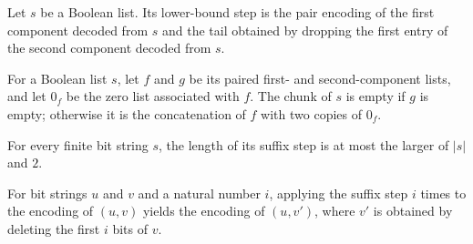 \begin{definition}
\label{Complexity.TQBFHard.lbStep}
\leanok
{}
Let $s$ be a Boolean list. Its lower-bound step is the pair encoding of the first
component decoded from $s$ and the tail obtained by dropping the first entry of the
second component decoded from $s$.
\end{definition}

\begin{definition}
\label{Complexity.TQBFHard.lbChunk}
\leanok
{}
For a Boolean list $s$, let $f$ and $g$ be its paired first- and second-component lists,
and let $0_f$ be the zero list associated with $f$. The chunk of $s$ is empty if $g$ is
empty; otherwise it is the concatenation of $f$ with two copies of $0_f$.
\end{definition}

\begin{theorem}
\label{Complexity.TQBFHard.length_lbStep}
\leanok
{}
For every finite bit string $s$, the length of its suffix step is at most the larger of
$|s|$ and $2$.
\end{theorem}

\begin{theorem}
\label{Complexity.TQBFHard.lbStep_iterate}
\leanok
{}
For bit strings $u$ and $v$ and a natural number $i$, applying the suffix step $i$ times
to the encoding of $(u,v)$ yields the encoding of $(u,v')$, where $v'$ is obtained by
deleting the first $i$ bits of $v$.
\end{theorem}

